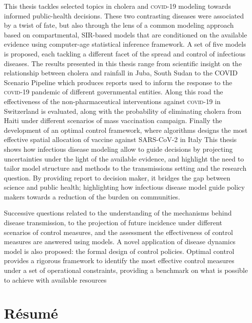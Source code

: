 This thesis tackles selected topics in cholera and \textsc{covid}-19 modeling towards informed public-health decisions. These two contrasting diseases were associated by a twist of fate, but also through the lens of a common modeling approach based on compartmental, SIR-based models that are conditioned on the available evidence using computer-age statistical inference framework. A set of five models is proposed, each tackling a different facet of the spread and control of infectious diseases. 
The results presented in this thesis range from scientific insight on the relationship between cholera and rainfall in Juba, South Sudan to the COVID Scenario Pipeline which produces reports used to inform the response to the \textsc{covid}-19 pandemic of different governmental entities. Along this road the effectiveness of the non-pharmaceutical interventions against \textsc{covid}-19 in Switzerland is evaluated, along with the probability of eliminating cholera from Haiti under different scenarios of mass vaccination campaign. Finally the development of an optimal control framework, where algorithms designs the most effective spatial allocation of vaccine against  SARS-CoV-2 in Italy
This thesis shows how infectious disease modeling allow to guide decisions by projecting uncertainties under the light of the available evidence, and highlight the need to tailor model structure and methods to the transmissions setting and the research question. By providing report to decision maker, it bridges the gap between science and public health; highlighting how infectious disease model guide policy makers towards a reduction of the burden on communities.

Successive questions related to the understanding of the mechanisms behind disease transmission, to the projection of future incidence under different scenarios of control measures, and the assessment the effectiveness of control measures are answered using models. A novel application of disease dynamics model is also proposed: the formal design of control policies. Optimal control provides a rigorous framework to identify the most effective control measures under a set of operational constraints, providing a benchmark on what is possible to achieve with available resources


 
 \chapter*{Résumé} 
 
